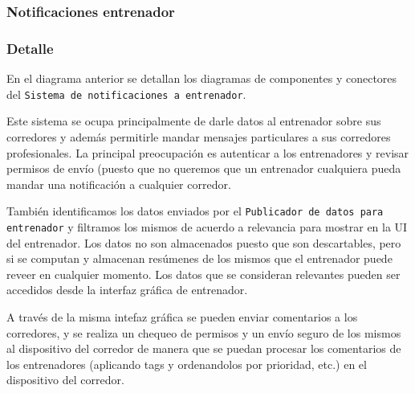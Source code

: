 \subsubsection{Notificaciones entrenador}


\subsubsection{Detalle}

En el diagrama anterior se detallan los diagramas de componentes y
conectores del \texttt{Sistema de notificaciones a entrenador}.

Este sistema se ocupa principalmente de darle datos al entrenador
sobre sus corredores y además permitirle mandar mensajes particulares
a sus corredores profesionales. La principal preocupación es 
autenticar a los entrenadores y revisar permisos de envío (puesto que
no queremos que un entrenador cualquiera pueda mandar una notificación
a cualquier corredor.

También identificamos los datos enviados por el \texttt{Publicador
de datos para entrenador} y filtramos los mismos de acuerdo a
relevancia para mostrar en la UI del entrenador. Los datos no son
almacenados puesto que son descartables, pero si se computan y
almacenan resúmenes de los mismos que el entrenador puede reveer
en cualquier momento. Los datos que se consideran relevantes pueden
ser accedidos desde la interfaz gráfica de entrenador.

A través de la misma intefaz gráfica se pueden enviar comentarios a
los corredores, y se realiza un chequeo de permisos y un envío seguro
de los mismos al dispositivo del corredor de manera que se puedan
procesar los comentarios de los entrenadores (aplicando tags y 
ordenandolos por prioridad, etc.) en el dispositivo del corredor.
